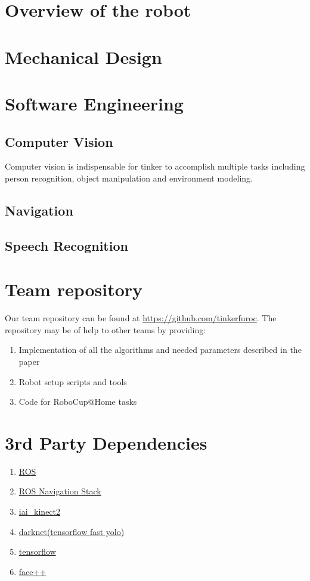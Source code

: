 \documentclass[runningheads,a4paper]{llncs}
\begin{document}
\section{Overview of the robot}


\section{Mechanical Design}


\section{Software Engineering}
\subsection{Computer Vision}
Computer vision is indispensable for tinker to accomplish multiple tasks including person recognition, object manipulation and environment modeling.


\subsection{Navigation}


\subsection{Speech Recognition}



\section{Team repository}
Our team repository can be found at \url{https://github.com/tinkerfuroc}. The repository may be of help to other teams by providing:
\begin{enumerate}
    \item Implementation of all the algorithms and needed parameters described in the paper
    \item Robot setup scripts and tools
    \item Code for RoboCup@Home tasks 
\end{enumerate}

\section{3rd Party Dependencies}
\begin{enumerate}
    \item \href{www.ros.org}{ROS}
    \item \href{github.com/ros-planning/navigation}{ROS Navigation Stack}
    \item \href{github.com/code-iai/iai\_kinect2}{iai\_kinect2}
    \item \href{github.com/pjreddie/darknet}{darknet(tensorflow fast yolo)}
    \item \href{www.tensorflow.org}{tensorflow}
    \item \href{www.faceplusplus.com}{face++}
\end{enumerate}
\end{document}
